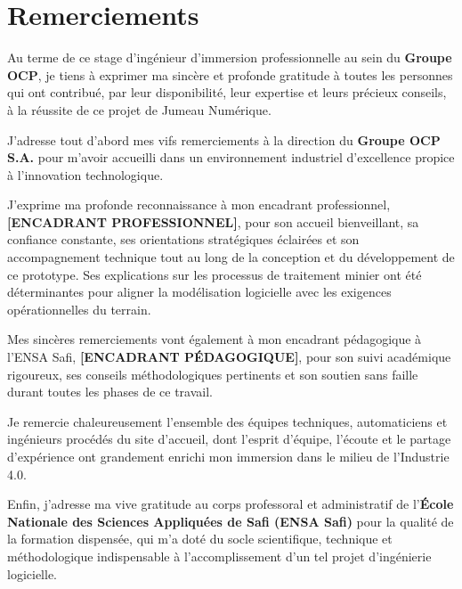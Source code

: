 ﻿\chapter*{Remerciements}

Au terme de ce stage d'ingénieur d'immersion professionnelle au sein du \textbf{Groupe OCP}, je tiens à exprimer ma sincère et profonde gratitude à toutes les personnes qui ont contribué, par leur disponibilité, leur expertise et leurs précieux conseils, à la réussite de ce projet de Jumeau Numérique.

J'adresse tout d'abord mes vifs remerciements à la direction du \textbf{Groupe OCP S.A.} pour m'avoir accueilli dans un environnement industriel d'excellence propice à l'innovation technologique.

J'exprime ma profonde reconnaissance à mon encadrant professionnel, \textbf{[ENCADRANT PROFESSIONNEL]}, pour son accueil bienveillant, sa confiance constante, ses orientations stratégiques éclairées et son accompagnement technique tout au long de la conception et du développement de ce prototype. Ses explications sur les processus de traitement minier ont été déterminantes pour aligner la modélisation logicielle avec les exigences opérationnelles du terrain.

Mes sincères remerciements vont également à mon encadrant pédagogique à l'ENSA Safi, \textbf{[ENCADRANT PÉDAGOGIQUE]}, pour son suivi académique rigoureux, ses conseils méthodologiques pertinents et son soutien sans faille durant toutes les phases de ce travail.

Je remercie chaleureusement l'ensemble des équipes techniques, automaticiens et ingénieurs procédés du site d'accueil, dont l'esprit d'équipe, l'écoute et le partage d'expérience ont grandement enrichi mon immersion dans le milieu de l'Industrie 4.0.

Enfin, j'adresse ma vive gratitude au corps professoral et administratif de l'\textbf{École Nationale des Sciences Appliquées de Safi (ENSA Safi)} pour la qualité de la formation dispensée, qui m'a doté du socle scientifique, technique et méthodologique indispensable à l'accomplissement d'un tel projet d'ingénierie logicielle.